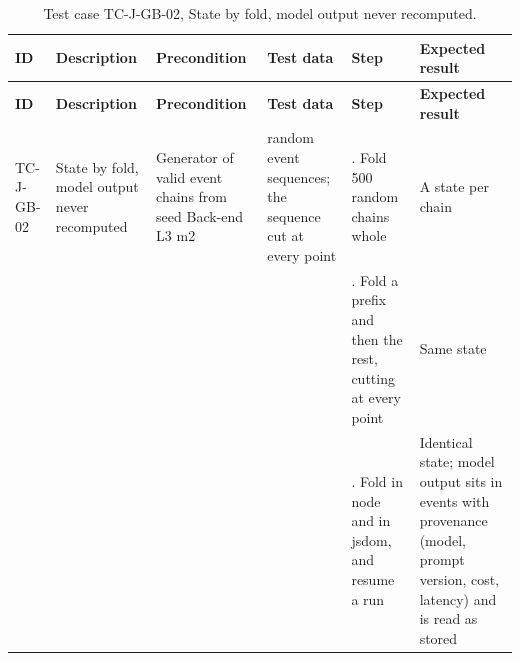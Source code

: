 {\footnotesize{}\renewcommand{\arraystretch}{1.1}
\begin{longtable}{|>{\raggedright\arraybackslash}p{}|>{\raggedright\arraybackslash}p{}|>{\raggedright\arraybackslash}p{}|>{\raggedright\arraybackslash}p{}|>{\raggedright\arraybackslash}p{}|>{\raggedright\arraybackslash}p{}|}
\caption{Test case TC-J-GB-02, State by fold, model output never recomputed.} \\
\hline
\textbf{ID} & \textbf{Description} & \textbf{Precondition} & \textbf{Test data} & \textbf{Step} & \textbf{Expected result} \\ \hline
\endfirsthead
\hline
\textbf{ID} & \textbf{Description} & \textbf{Precondition} & \textbf{Test data} & \textbf{Step} & \textbf{Expected result} \\ \hline
\endhead
TC-J-GB-02 & State by fold, model output never recomputed & Generator of valid event chains from seed Back-end L3 m2 & 500 random event sequences; the sequence cut at every point & 1. Fold 500 random chains whole & A state per chain \\ \cline{5-6}
 &  &  &  & 2. Fold a prefix and then the rest, cutting at every point & Same state \\ \cline{5-6}
 &  &  &  & 3. Fold in node and in jsdom, and resume a run & Identical state; model output sits in events with provenance (model, prompt version, cost, latency) and is read as stored \\ \hline
\end{longtable}
}

